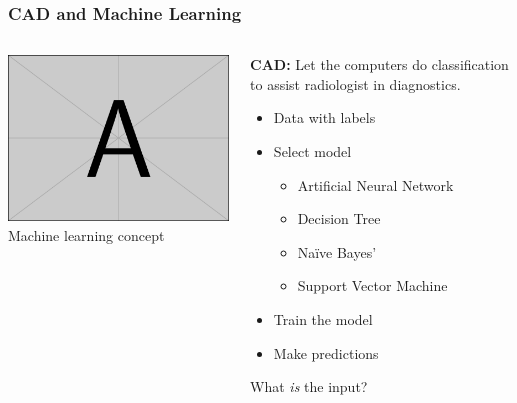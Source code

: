\documentclass[aspectratio=1610]{beamer}
\begin{document}
\begin{frame}
  \frametitle{\hfill CAD and Machine Learning}
  \begin{columns}[T]
    \begin{column}{.5\textwidth}
      \begin{block}{}
        \includegraphics[width=\textwidth]{images/example-image-a.png}\\
        Machine learning concept
      \end{block}
    \end{column}
    \begin{column}{.5\textwidth}
      \begin{block}{}
        \textbf{CAD:} Let the computers do classification to assist radiologist in diagnostics.
        \begin{itemize}
          \item Data with labels\pause
          \item Select model\pause
          \begin{itemize}
            \item Artificial Neural Network
            \item Decision Tree
            \item Na\"ive Bayes'
            \item Support Vector Machine
          \end{itemize}
          \item Train the model\pause
          \item Make predictions\pause
        \end{itemize}
        \vspace{0.02\textheight}
        What \textit{is} the input?
      \end{block}
    \end{column}
  \end{columns}
\end{frame}
\end{document}
